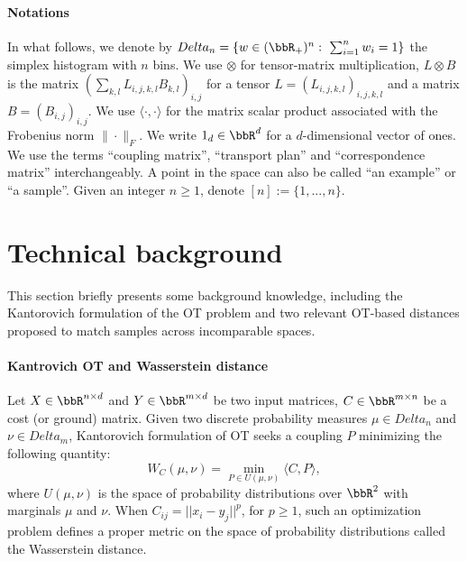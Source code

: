 \paragraph{Notations} In what follows, we denote by
$Delta_{n}=\{w \in (\bbR_{+})^{n}:\ \sum_{i=1}^{n} w_{i}=1\}$
the simplex histogram with $n$ bins. We use $\otimes$ for tensor-matrix multiplication,
\ie $L \otimes B$ is the matrix $(\sum_{k,l} L_{i,j,k,l} B_{k,l})_{i,j}$ for a tensor
$L =(L_{i,j,k,l})_{i,j,k,l}$ and a matrix $B = (B_{i,j})_{i,j}$.
We use $\langle \cdot, \cdot \rangle$ for the matrix scalar product associated with
the Frobenius norm $\|\cdot\|_{F}$. We write $1_d \in \bbR^d$ for a
$d$-dimensional vector of ones.
We use the terms ``coupling matrix'', ``transport plan'' and ``correspondence matrix'' interchangeably.
A point in the space can also be called ``an example'' or ``a sample''.
Given an integer $n \geq 1$, denote $[n] := \{ 1, ..., n\}$.

\section{Technical background}

This section briefly presents some background knowledge,
including the Kantorovich formulation of the OT problem and two relevant OT-based distances
proposed to match samples across incomparable spaces.

\paragraph{Kantrovich OT and Wasserstein distance}
Let $X \in \bbR^{n\times d}$ and $Y \in \bbR^{m\times d}$ be two input matrices,
$C \in \bbR^{m \times n}$ be a cost (or ground) matrix.
Given two discrete probability measures $\mu \in Delta_n$ and $\nu\in Delta_m$,
Kantorovich formulation of OT seeks a coupling $P$ minimizing the following quantity:
\begin{equation}
  W_C(\mu,\nu) = \min_{P \in U(\mu,\nu)} \langle C, P \rangle,
  \label{eq:wasserstein}
 \end{equation}
where $U(\mu,\nu)$ is the space of probability distributions over
$\bbR^2$ with marginals $\mu$ and $\nu$. When $C_{ij} = ||x_i - y_j||^p$, for $p \geq 1$,
such an optimization problem defines a proper metric on the space of
probability distributions called the Wasserstein distance.

